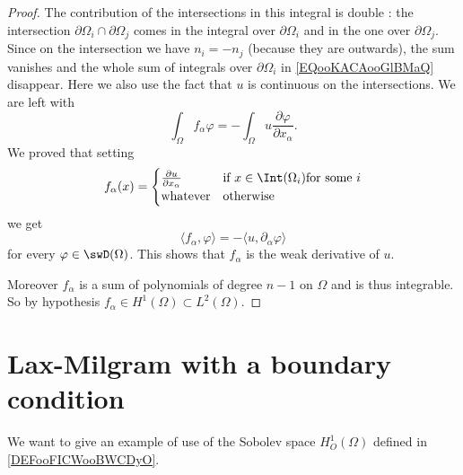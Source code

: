 \begin{proof}
    The contribution of the intersections in this integral is double : the intersection \( \partial\Omega_i\cap\partial\Omega_j\) comes in the integral over \( \partial\Omega_i\) and in the one over \( \partial\Omega_j\). Since on the intersection we have \( n_i=-n_j\) (because they are outwards), the sum vanishes and the whole sum of integrals over \( \partial\Omega_i\) in \eqref{EQooKACAooGlBMaQ} disappear. Here we also use the fact that \( u\) is continuous on the intersections. We are left with
    \begin{equation}
        \int_{\Omega}f_{\alpha}\varphi=-\int_{\Omega}u\frac{ \partial \varphi }{ \partial x_{\alpha} }. 
    \end{equation}
    We proved that setting
    \begin{equation}
        f_{\alpha}(x)=\begin{cases}
            \frac{ \partial u }{ \partial x_{\alpha} }    &   \text{if } x\in\Int(\Omega_i) \text{for some }i\\
            \text{whatever}    &    \text{otherwise }
        \end{cases}
    \end{equation}
    we get
    \begin{equation}
        \langle f_{\alpha}, \varphi\rangle =-\langle u, \partial_{\alpha}\varphi\rangle 
    \end{equation}
    for every \( \varphi\in\swD(\Omega)\). This shows that \( f_{\alpha}\) is the weak derivative of \( u\). 

    Moreover \( f_{\alpha}\) is a sum of polynomials of degree \( n-1\) on \( \Omega\) and is thus integrable. So by hypothesis \( f_{\alpha}\in H^1(\Omega)\subset L^2(\Omega)\).
\end{proof}

\section{Lax-Milgram with a boundary condition}

We want to give an example of use of the Sobolev space \( H_O^1(\Omega)\) defined in \ref{DEFooFICWooBWCDyO}.

